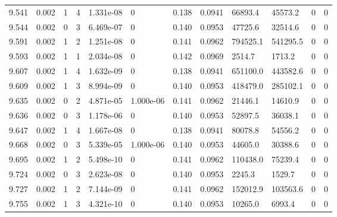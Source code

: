 \documentclass[preview]{standalone}
\begin{document}
{{{{{{{{{{{{{\begin{tabular}{L{1.2cm}C{1.2cm} C{0.3cm}C{0.5cm} C{1.4cm}C{1.4cm} C{1.4cm}C{1.4cm} C{1.6cm}C{1.6cm} C{1.6cm}C{1.6cm}}
  9.541  &  0.002  & 1     &  4 &  1.331e-08  & 0  &  0.138&   0.0941& 66893.4 & 45573.2   &  0 & 0  \\ 
  9.544  &  0.002  & 0     &  3 &  6.469e-07  & 0  &  0.140&   0.0953& 47725.6 & 32514.6   &  0 & 0  \\ 
  9.591  &  0.002  & 1     &  2 &  1.251e-08  & 0  &  0.141&   0.0962& 794525.1 & 541295.5   &  0 & 0  \\ 
  9.593  &  0.002  & 1     &  1 &  2.034e-08  & 0  &  0.142&   0.0969& 2514.7 & 1713.2   &  0 & 0  \\ 
  9.607  &  0.002  & 1     &  4 &  1.632e-09  & 0  &  0.138&   0.0941& 651100.0 & 443582.6   &  0 & 0  \\ 
  9.609  &  0.002  & 1     &  3 &  8.994e-09  & 0  &  0.140&   0.0953& 418479.0 & 285102.1   &  0 & 0  \\ 
  9.635  &  0.002  & 0     &  2 &  4.871e-05  & 1.000e-06  &  0.141&   0.0962& 21446.1 & 14610.9   &  0 & 0  \\ 
  9.636  &  0.002  & 0     &  3 &  1.178e-06  & 0  &  0.140&   0.0953& 52897.5 & 36038.1   &  0 & 0  \\ 
  9.647  &  0.002  & 1     &  4 &  1.667e-08  & 0  &  0.138&   0.0941& 80078.8 & 54556.2   &  0 & 0  \\ 
  9.668  &  0.002  & 0     &  3 &  5.339e-05  & 1.000e-06  &  0.140&   0.0953& 44605.0 & 30388.6   &  0 & 0  \\ 
  9.695  &  0.002  & 1     &  2 &  5.498e-10  & 0  &  0.141&   0.0962& 110438.0 & 75239.4   &  0 & 0  \\ 
  9.724  &  0.002  & 0     &  3 &  2.623e-08  & 0  &  0.140&   0.0953& 2245.3 & 1529.7   &  0 & 0  \\ 
  9.727  &  0.002  & 1     &  2 &  7.144e-09  & 0  &  0.141&   0.0962& 152012.9 & 103563.6   &  0 & 0  \\ 
  9.755  &  0.002  & 1     &  3 &  4.321e-10  & 0  &  0.140&   0.0953& 10265.0 & 6993.4   &  0 & 0  \\ 
\hline 
\end{tabular} 

}}}}}}}}}}}}}
\end{document}
